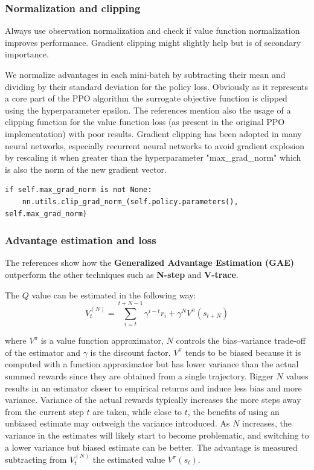 \documentclass[11pt, a4paper, hidelinks]{report}
\begin{document}
\subsubsection{Normalization and clipping}

\begin{quoting}[font=itshape, begintext={"}, endtext={"\citep{ppo-implementation-2}}]
Always use observation normalization and check if value function normalization improves performance.
Gradient clipping might slightly help but is of secondary importance.
\end{quoting}

We normalize advantages in each mini-batch by subtracting their mean and dividing by their standard deviation for the policy loss.
Obviously as it represents a core part of the PPO algorithm the surrogate objective function is clipped using the hyperparameter epsilon.
The references mention also the usage of a clipping function for the value function loss (as present in the original PPO implementation) with poor results.
Gradient clipping has been adopted in many neural networks, especially recurrent neural networks to avoid gradient explosion by rescaling it when greater than the hyperparameter "max\_grad\_norm" which is also the norm of the new gradient vector.
\begin{lstlisting}[label={lst:gradient-clipping}]
if self.max_grad_norm is not None:
	nn.utils.clip_grad_norm_(self.policy.parameters(), self.max_grad_norm)
\end{lstlisting}

\subsubsection{Advantage estimation and loss}\label{subsubsec:advantage-estimation}

The references show how the \textbf{Generalized Advantage Estimation (GAE)} outperform the other techniques such as \textbf{N-step} and \textbf{V-trace}.

The $Q$ value can be estimated in the following way:
\begin{equation}
	V_t^{(N)} = \sum_{i = t}^{t + N - 1} \gamma^{i - t}r_i + \gamma^{N}V^{\pi}(s_{t + N})\label{eq:N-step}
\end{equation}

where $V^{\pi}$ is a value function approximator, $N$ controls the bias–variance trade-off of the estimator and $\gamma$ is the discount factor.
$V^{\pi}$ tends to be biased because it is computed with a function approximator but has lower variance than the actual summed rewards since they are obtained from a single trajectory.
Bigger $N$ values results in an estimator closer to empirical returns and induce less bias and more variance.
Variance of the actual rewards typically increases the more steps away from the current step $t$ are taken, while close to $t$, the benefits of using an unbiased estimate may outweigh the variance introduced.
As $N$ increases, the variance in the estimates will likely start to become problematic, and switching to a lower variance but biased estimate can be better.
The advantage is measured subtracting from $V_t^{(N)}$ the estimated value $V^{\pi}(s_t)$.
\end{document}

